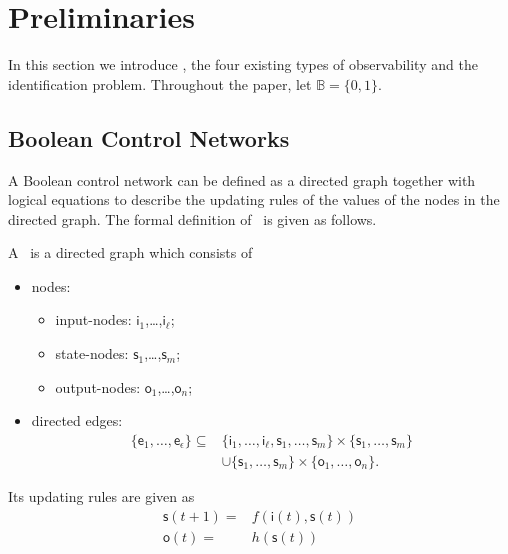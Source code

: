 
\section{Preliminaries} 
\label{sec:pre}
In this section we introduce {\BCNs}, the four existing types of observability and the identification problem. Throughout the paper,  let $\mathbb{B}=\{0,1\}$.

\subsection{Boolean Control Networks}

A Boolean control network can be defined as a directed graph together with logical equations to describe the updating rules of the values of the nodes in  the directed graph. The formal definition of \BCN\ is given as follows. 

\begin{definition} A \BCN\
	is a directed graph which consists of 
	\begin{itemize}
	\item nodes:
	\begin{itemize}
	\item input-nodes: {$\mathsf{i}_1$,\ldots ,$\mathsf{i}_{\ell}$};  
	\item state-nodes: {$\mathsf{s}_1$,\ldots ,$\mathsf{s}_m$};
	\item output-nodes: {$\mathsf{o}_1$,\ldots ,$\mathsf{o}_n$};
	\end{itemize}	
	\item  directed edges: 
		\begin{equation*}
			\begin{split}
				\{\mathsf{e}_1,\ldots,\mathsf{e}_{\epsilon}\}\subseteq & \{\mathsf{i}_1,\ldots ,\mathsf{i}_{\ell},\mathsf{s}_1,\ldots ,\mathsf{s}_m\}\times \{\mathsf{s}_1,\ldots ,\mathsf{s}_m\} \\
				&\cup \{\mathsf{s}_1,\ldots ,\mathsf{s}_m\}\times\{\mathsf{o}_1,\ldots ,\mathsf{o}_n\}. 
			\end{split}
		\end{equation*}
	
\end{itemize}	
Its updating rules are given as
\begin{equation}
\begin{split}
\mathsf{s}(t+1)=&f(\mathsf{i}(t),\mathsf{s}(t))\\
\mathsf{o}(t)=&h(\mathsf{s}(t))
\end{split}
\label{equ:1}
\end{equation}
 \end{definition}

